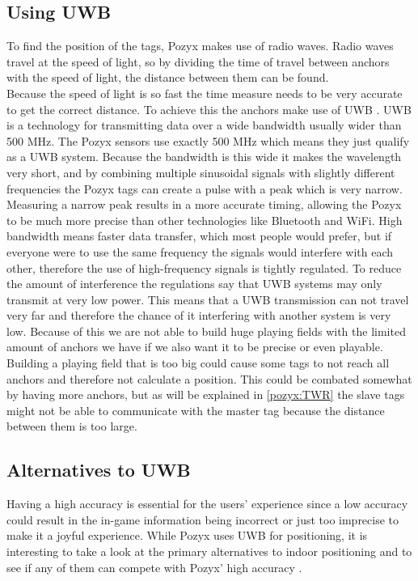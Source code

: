 \subsection{Using UWB}
To find the position of the tags, Pozyx makes use of radio waves. 
Radio waves travel at the speed of light, so by dividing the time of travel between anchors with the speed of light, the distance between them can be found.\\
Because the speed of light is so fast the time measure needs to be very accurate to get the correct distance.
To achieve this the anchors make use of UWB \cite{pozyx-UWB}.
UWB is a technology for transmitting data over a wide bandwidth usually wider than 500 MHz.
The Pozyx sensors use exactly 500 MHz which means they just qualify as a UWB system.
Because the bandwidth is this wide it makes the wavelength very short, and by combining multiple sinusoidal signals with slightly different frequencies the Pozyx tags can create a pulse with a peak which is very narrow.
Measuring a narrow peak results in a more accurate timing, allowing the Pozyx to be much more precise than other technologies like Bluetooth and WiFi.
High bandwidth means faster data transfer, which most people would prefer, but if everyone were to use the same frequency the signals would interfere with each other, therefore the use of high-frequency signals is tightly regulated\cite{tait-radio}.
To reduce the amount of interference the regulations say that UWB systems may only transmit at very low power.
This means that a UWB transmission can not travel very far and therefore the chance of it interfering with another system is very low.
Because of this we are not able to build huge playing fields with the limited amount of anchors we have if we also want it to be precise or even playable.
Building a playing field that is too big could cause some tags to not reach all anchors and therefore not calculate a position.
This could be combated somewhat by having more anchors, but as will be explained in \ref{pozyx:TWR} the slave tags might not be able to communicate with the master tag because the distance between them is too large.

\subsection{Alternatives to UWB}
Having a high accuracy is essential for the users' experience since a low accuracy could result in the in-game information being incorrect or just too imprecise to make it a joyful experience.
While Pozyx uses UWB for positioning, it is interesting to take a look at the primary alternatives to indoor positioning and to see if any of them can compete with Pozyx' high accuracy \cite{pozyx}.

